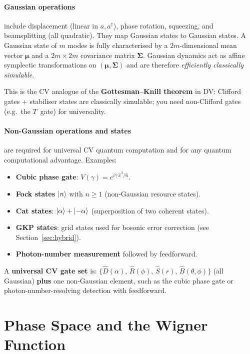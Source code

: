 \documentclass[11pt]{article}
\newcommand{\xh}{\hat{x}}
\newcommand{\ad}{a^{\dagger}}
\newcommand{\Dop}{\hat{D}}
\newcommand{\Sop}{\hat{S}}
\newcommand{\Rop}{\hat{R}}
\begin{document}
\paragraph{Gaussian operations} include displacement (linear in $a, \ad$),
phase rotation, squeezing, and beamsplitting (all quadratic).
They map Gaussian states to Gaussian states.
A Gaussian state of $m$ modes is fully characterised by a $2m$-dimensional
mean vector $\bm{\mu}$ and a $2m \times 2m$ covariance matrix $\bm{\Sigma}$.
Gaussian dynamics act as affine symplectic transformations on
$(\bm{\mu}, \bm{\Sigma})$ and are therefore \emph{efficiently classically
simulable}.

This is the CV analogue of the \textbf{Gottesman--Knill theorem} in DV:
Clifford gates + stabiliser states are classically simulable; you need
non-Clifford gates (e.g.\ the $T$~gate) for universality.

\paragraph{Non-Gaussian operations and states} are required for
universal CV quantum computation and for any quantum computational
advantage.  Examples:
\begin{itemize}[nosep]
\item \textbf{Cubic phase gate}: $V(\gamma) = e^{i\gamma\,\xh^3/6}$.
\item \textbf{Fock states} $\ket{n}$ with $n \geq 1$ (non-Gaussian resource states).
\item \textbf{Cat states}:
  $\ket{\alpha} + \ket{-\alpha}$ (superposition of two coherent states).
\item \textbf{GKP states}: grid states used for bosonic error correction
  (see Section~\ref{sec:hybrid}).
\item \textbf{Photon-number measurement} followed by feedforward.
\end{itemize}

A \textbf{universal CV gate set} is:
$\{\Dop(\alpha),\, \Rop(\phi),\, \Sop(r),\, \hat{B}(\theta,\phi)\}$
(all Gaussian) \textbf{plus} one non-Gaussian element, such as the cubic
phase gate or photon-number-resolving detection with feedforward.

\section{Phase Space and the Wigner Function}
\label{sec:wigner}
\end{document}
